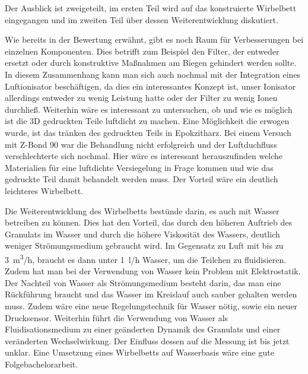 Der Ausblick ist zweigeteilt, im ersten Teil wird auf das konstruierte Wirbelbett eingegangen und im zweiten Teil über dessen Weiterentwicklung diskutiert. 

Wie bereits in der Bewertung erwähnt, gibt es noch Raum für Verbesserungen bei einzelnen Komponenten. Dies betrifft zum Beispiel den Filter, der entweder ersetzt oder durch konstruktive Maßnahmen am Biegen gehindert werden sollte. In diesem Zusammenhang kann man sich auch nochmal mit der Integration eines Luftionisator beschäftigen, da dies ein interessantes Konzept ist, unser Ionisator allerdings entweder zu wenig Leistung hatte oder der Filter zu wenig Ionen durchließ.
Weiterhin wäre es interessant zu untersuchen, ob und wie es möglich ist die 3D gedruckten Teile luftdicht zu machen. Eine Möglichkeit die erwogen wurde, ist das tränken des gedruckten Teils in Epokzitharz. Bei einem Versuch mit Z-Bond 90 war die Behandlung nicht erfolgreich und der Luftduchfluss verschlechterte sich nochmal. Hier wäre es interessant herauszufinden welche Materialien für eine luftdichte Versiegelung in Frage kommen und wie das gedruckte Teil damit behandelt werden muss. Der Vorteil wäre ein deutlich leichteres Wirbelbett.

Die Weiterentwicklung des Wirbelbetts bestünde darin, es auch mit Wasser betreiben zu können. Dies hat den Vorteil, das durch den höheren Auftrieb des Granulats im Wasser und durch die höhere Viskosität des Wassers, deutlich weniger Strömungsmedium gebraucht wird. Im Gegensatz zu Luft mit bis zu \SI{3}{m^3/h}, braucht es dann unter \SI{1}{l/h} Wasser, um die Teilchen zu fluidisieren. Zudem hat man bei der Verwendung von Wasser kein Problem mit Elektrostatik.
Der Nachteil von Wasser als Strömungsmedium besteht darin, das man eine Rückführung braucht und das Wasser im Kreislauf auch sauber gehalten werden muss. Zudem wäre eine neue Regelungstechnik für Wasser nötig, sowie ein neuer Drucksensor. Weiterhin führt die Verwendung von Wasser als Fluidisationsmedium zu einer geänderten Dynamik des Granulats und einer veränderten Wechselwirkung. Der Einfluss dessen auf die Messung ist bis jetzt unklar. Eine Umsetzung eines Wirbelbetts auf Wasserbasis wäre eine gute Folgebachelorarbeit.


